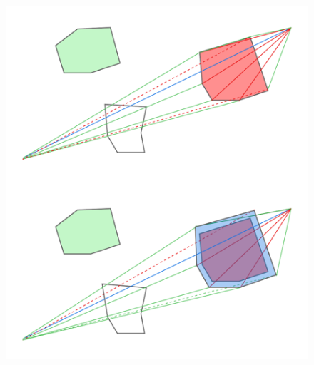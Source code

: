 \begin{figure}[!h]
    \begin{center}
        \includegraphics[scale=0.35]{images/routing-algo}
    \end{center}
\end{figure}
